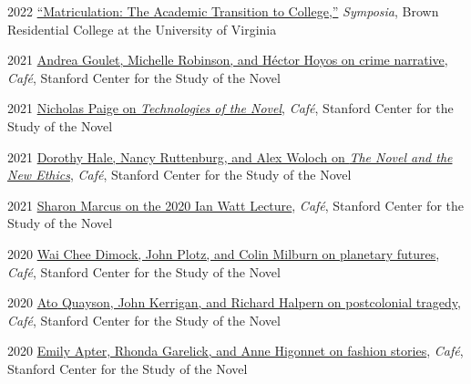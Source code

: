 \documentclass[12pt,letterpaper]{report}
\begin{document}
\begin{tablist}
	\item[2022] \tab{}\href{https://virginiaaudio.org/\#/symposia/}{\enquote{Matriculation: The Academic Transition to College,}} \emph{Symposia}, Brown Residential College at the University of Virginia
	\item[2021] \tab{}\href{https://web.archive.org/web/20220429010015/https://novel.stanford.edu/csn-cafe/2021/7/23/crime-narratives-with-andrea-goulet-michelle-robinson-and-hctor-hoyos-43021-je87a}{Andrea Goulet, Michelle Robinson, and Héctor Hoyos on crime narrative}, \emph{Café}, Stanford Center for the Study of the Novel
	\item[2021] \tab{}\href{https://web.archive.org/web/20220429093420/https://novel.stanford.edu/csn-cafe/2021/7/23/nicholas-paige-technologies-of-the-novel-2821}{Nicholas Paige on \emph{Technologies of the Novel}}, \emph{Café}, Stanford Center for the Study of the Novel
	\item[2021] \tab{}\href{https://web.archive.org/web/20220429093353/https://novel.stanford.edu/csn-cafe/2021/7/23/books-at-the-center-dorothy-hale-the-novel-and-the-new-ethics-11521}{Dorothy Hale, Nancy Ruttenburg, and Alex Woloch on \emph{The Novel and the New Ethics}}, \emph{Café}, Stanford Center for the Study of the Novel
	\item[2021] \tab{}\href{https://web.archive.org/web/20220429093326/https://novel.stanford.edu/csn-cafe/2021/7/23/sharon-marcus-on-her-ian-watt-lecture-103020}{Sharon Marcus on the 2020 Ian Watt Lecture}, \emph{Café}, Stanford Center for the Study of the Novel
	\item[2020] \tab{}\href{https://web.archive.org/web/20220429010109/https://novel.stanford.edu/csn-cafe/2021/7/23/wai-chee-dimock-john-plotz-and-colin-milburn-on-the-literature-of-planetary-futures-52319}{Wai Chee Dimock, John Plotz, and Colin Milburn on planetary futures}, \emph{Café}, Stanford Center for the Study of the Novel
	\item[2020] \tab{}\href{https://web.archive.org/web/20220429010041/https://novel.stanford.edu/csn-cafe/2021/7/23/ato-quayson-john-kerrigan-and-richard-halpern-on-postcolonial-tragedy-91519}{Ato Quayson, John Kerrigan, and Richard Halpern on postcolonial tragedy}, \emph{Café}, Stanford Center for the Study of the Novel
	\item[2020] \tab{}\href{https://web.archive.org/web/20220429093237/https://novel.stanford.edu/csn-cafe/2021/7/23/fashion-stories-emily-apter-rhonda-garelick-and-anne-higonnet-on-the-cultural-history-of-clothing-1920}{Emily Apter, Rhonda Garelick, and Anne Higonnet on fashion stories}, \emph{Café}, Stanford Center for the Study of the Novel

\end{tablist}
\end{document}
